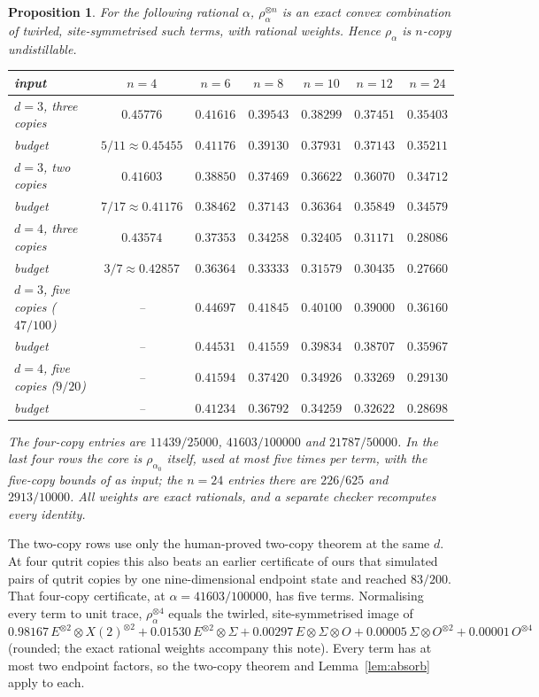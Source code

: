 \documentclass[11pt]{article}
\newtheorem{proposition}[theorem]{Proposition}
\theoremstyle{remark}
\begin{document}
\begin{proposition}\label{prop:corr}
For the following rational $\alpha$, $\rho_\alpha^{\otimes n}$ is an exact convex combination of twirled,
site-symmetrised such terms, with rational weights. Hence $\rho_\alpha$ is $n$-copy undistillable.
\begin{center}
\begin{tabular}{lcccccc}
\toprule
input & $n=4$ & $n=6$ & $n=8$ & $n=10$ & $n=12$ & $n=24$\\
\midrule
$d=3$, three copies & $0.45776$ & $0.41616$ & $0.39543$ & $0.38299$ & $0.37451$ & $0.35403$\\
\quad budget & $5/11\approx0.45455$ & $0.41176$ & $0.39130$ & $0.37931$ & $0.37143$ & $0.35211$\\
$d=3$, two copies & $0.41603$ & $0.38850$ & $0.37469$ & $0.36622$ & $0.36070$ & $0.34712$\\
\quad budget & $7/17\approx0.41176$ & $0.38462$ & $0.37143$ & $0.36364$ & $0.35849$ & $0.34579$\\
$d=4$, three copies & $0.43574$ & $0.37353$ & $0.34258$ & $0.32405$ & $0.31171$ & $0.28086$\\
\quad budget & $3/7\approx0.42857$ & $0.36364$ & $0.33333$ & $0.31579$ & $0.30435$ & $0.27660$\\
\midrule
$d=3$, five copies ($47/100$) & -- & $0.44697$ & $0.41845$ & $0.40100$ & $0.39000$ & $0.36160$\\
\quad budget & -- & $0.44531$ & $0.41559$ & $0.39834$ & $0.38707$ & $0.35967$\\
$d=4$, five copies ($9/20$) & -- & $0.41594$ & $0.37420$ & $0.34926$ & $0.33269$ & $0.29130$\\
\quad budget & -- & $0.41234$ & $0.36792$ & $0.34259$ & $0.32622$ & $0.28698$\\
\bottomrule
\end{tabular}
\end{center}
The four-copy entries are $11439/25000$, $41603/100000$ and $21787/50000$. In the last four rows the core is
$\rho_{\alpha_0}$ itself, used at most five times per term, with the five-copy bounds of \cite{Tomar} as input; the
$n=24$ entries there are $226/625$ and $2913/10000$. All weights are exact rationals, and a separate checker
recomputes every identity.
\end{proposition}
The two-copy rows use only the human-proved two-copy theorem at the same $d$. At four qutrit copies this also beats
an earlier certificate of ours that simulated pairs of qutrit copies by one nine-dimensional endpoint state and
reached $83/200$. That four-copy certificate, at $\alpha=41603/100000$, has five terms. Normalising every term to
unit trace, $\rho_\alpha^{\otimes4}$ equals the twirled, site-symmetrised image of
\[
0.98167\,E^{\otimes2}\otimes X(2)^{\otimes2}+0.01530\,E^{\otimes2}\otimes\Sigma+0.00297\,E\otimes\Sigma\otimes O
+0.00005\,\Sigma\otimes O^{\otimes2}+0.00001\,O^{\otimes4}
\]
(rounded; the exact rational weights accompany this note). Every term has at most two endpoint factors, so the
two-copy theorem and Lemma~\ref{lem:absorb} apply to each.
\end{document}
